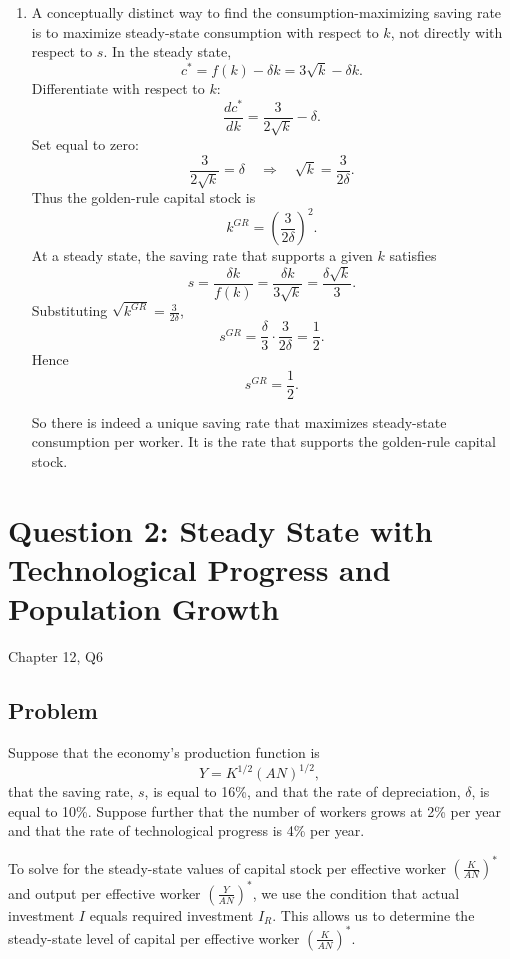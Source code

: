 \documentclass[12pt]{article}
\begin{document}
\begin{enumerate}[label=(\alph*)]
    \item
    A conceptually distinct way to find the consumption-maximizing saving rate is to maximize steady-state consumption with respect to \(k\), not directly with respect to \(s\). In the steady state,
    \[
    c^*=f(k)-\delta k = 3\sqrt{k}-\delta k.
    \]
    Differentiate with respect to \(k\):
    \[
    \frac{dc^*}{dk}=\frac{3}{2\sqrt{k}}-\delta.
    \]
    Set equal to zero:
    \[
    \frac{3}{2\sqrt{k}}=\delta
    \quad\Longrightarrow\quad
    \sqrt{k}=\frac{3}{2\delta}.
    \]
    Thus the golden-rule capital stock is
    \[
    k^{GR}=\left(\frac{3}{2\delta}\right)^2.
    \]
    At a steady state, the saving rate that supports a given \(k\) satisfies
    \[
    s=\frac{\delta k}{f(k)}
    =\frac{\delta k}{3\sqrt{k}}
    =\frac{\delta \sqrt{k}}{3}.
    \]
    Substituting \(\sqrt{k^{GR}}=\frac{3}{2\delta}\),
    \[
    s^{GR}=\frac{\delta}{3}\cdot \frac{3}{2\delta}=\frac12.
    \]
    Hence
    \[
    \boxed{s^{GR}=\frac12.}
    \]

    So there is indeed a unique saving rate that maximizes steady-state consumption per worker. It is the rate that supports the golden-rule capital stock.
\end{enumerate}

\newpage
\section{Question 2: Steady State with Technological Progress and Population Growth}

\noindent
Chapter 12, Q6

\subsection{Problem}
Suppose that the economy’s production function is
\[
Y = K^{1/2}(AN)^{1/2},
\]
that the saving rate, \(s\), is equal to 16\%, and that the rate of depreciation, \(\delta\), is equal to 10\%. Suppose further that the number of workers grows at 2\% per year and that the rate of technological progress is 4\% per year.

To solve for the steady-state values of capital stock per effective worker \(\left(\frac{K}{AN}\right)^*\) and output per effective worker \(\left(\frac{Y}{AN}\right)^*\), we use the condition that actual investment \(I\) equals required investment \(I_R\). This allows us to determine the steady-state level of capital per effective worker \(\left(\frac{K}{AN}\right)^*\).
\end{document}
